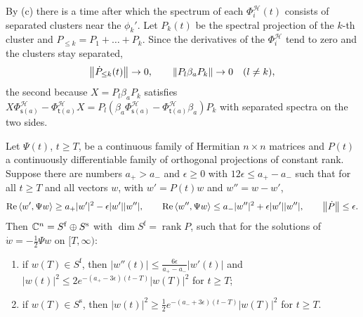 By (c) there is a time after which the spectrum of each
$\Phi^{\mathcal H}_i(t)$ consists of separated clusters near the
$\phi_k'$. Let $P_k(t)$ be the spectral projection of the $k$-th cluster and
$P_{\leq k}=P_1+\dots+P_k$. Since the derivatives of the
$\Phi^{\mathcal H}_i$ tend to zero and the clusters stay separated,
\begin{equation}\label{eq:slow}
 \left\lVert\dot P_{\leq k}(t)\right\rVert\to0,\qquad\left\lVert P_l\beta_aP_k\right\rVert\to0\quad(l\neq k),
\end{equation}
the second because $X=P_l\beta_aP_k$ satisfies
$X\Phi^{\mathcal H}_{\mathsf s(a)}-\Phi^{\mathcal H}_{\mathsf t(a)}X=P_l(\beta_a\Phi^{\mathcal H}_{\mathsf s(a)}-\Phi^{\mathcal H}_{\mathsf t(a)}\beta_a)P_k$
with separated spectra on the two sides.

\begin{lemma}\label{lem:dichotomy}
Let $\Psi(t)$, $t\geq T$, be a continuous family of Hermitian
$n\times n$ matrices and $P(t)$ a continuously differentiable family of
orthogonal projections of constant rank. Suppose there are numbers
$a_+>a_-$ and $\epsilon\geq0$ with $12\epsilon\leq a_+-a_-$ such that for
all $t\geq T$ and all vectors $w$, with $w'=P(t)w$ and $w''=w-w'$,
\[
 \operatorname{Re}\left\langle w',\Psi w\right\rangle\geq a_+|w'|^2-\epsilon|w'||w''|,\qquad
 \operatorname{Re}\left\langle w'',\Psi w\right\rangle\leq a_-|w''|^2+\epsilon|w'||w''|,\qquad
 \left\lVert\dot P\right\rVert\leq\epsilon .
\]
Then $\mathbb C^n=S^{\mathrm f}\oplus S^{\mathrm s}$ with
$\dim S^{\mathrm f}=\operatorname{rank}P$, such that for the solutions of
$\dot w=-\frac12\Psi w$ on $[T,\infty)$:
\begin{enumerate}
\item[(i)] if $w(T)\in S^{\mathrm f}$, then
 $|w''(t)|\leq\frac{6\epsilon}{a_+-a_-}|w'(t)|$ and
 $|w(t)|^2\leq2e^{-(a_+-3\epsilon)(t-T)}|w(T)|^2$ for $t\geq T$;
\item[(ii)] if $w(T)\in S^{\mathrm s}$, then
 $|w(t)|^2\geq\frac12e^{-(a_-+3\epsilon)(t-T)}|w(T)|^2$ for $t\geq T$.
\end{enumerate}
\end{lemma}

